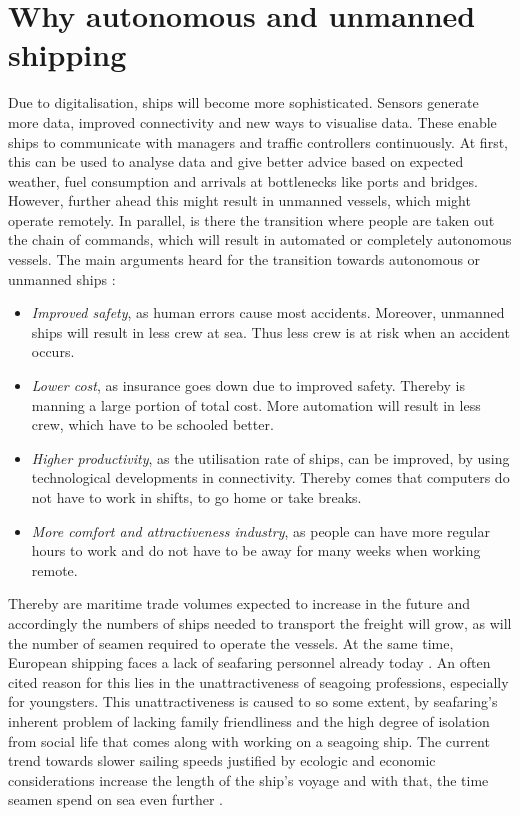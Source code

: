 \section{Why autonomous and unmanned shipping}
Due to digitalisation, ships will become more sophisticated. Sensors generate more data, improved connectivity and new ways to visualise data. These enable ships to communicate with managers and traffic controllers continuously. At first, this can be used to analyse data and give better advice based on expected weather, fuel consumption and arrivals at bottlenecks like ports and bridges.
However, further ahead this might result in unmanned vessels, which might operate remotely. In parallel, is there the transition where people are taken out the chain of commands, which will result in automated or completely autonomous vessels. The main arguments heard for the transition towards autonomous or unmanned ships \cite{Saarni2018}:
\begin{itemize}
	\item \emph{Improved safety}, as human errors cause most accidents. Moreover, unmanned ships will result in less crew at sea. Thus less crew is at risk when an accident occurs.
	\item \emph{Lower cost}, as insurance goes down due to improved safety. Thereby is manning a large portion of total cost. More automation will result in less crew, which have to be schooled better.
	\item \emph{Higher productivity}, as the utilisation rate of ships, can be improved, by using technological developments in connectivity. Thereby comes that computers do not have to work in shifts, to go home or take breaks.
	\item \emph{More comfort and attractiveness industry}, as people can have more regular hours to work and do not have to be away for many weeks when working remote.
\end{itemize}
Thereby are maritime trade volumes expected to increase in the future and accordingly the numbers of ships needed to transport the freight will grow, as will the number of seamen required to operate the vessels. At the same time, European shipping faces a lack of seafaring personnel already today \cite{Cahoon2014}. An often cited reason for this lies in the unattractiveness of seagoing professions, especially for youngsters. This unattractiveness is caused to so some extent, by seafaring’s inherent problem of lacking family friendliness and the high degree of isolation from social life that comes along with working on a seagoing ship. The current trend towards slower sailing speeds justified by ecologic and economic considerations increase the length of the ship’s voyage and with that, the time seamen spend on sea even further \cite{Finnsgard2018}.

